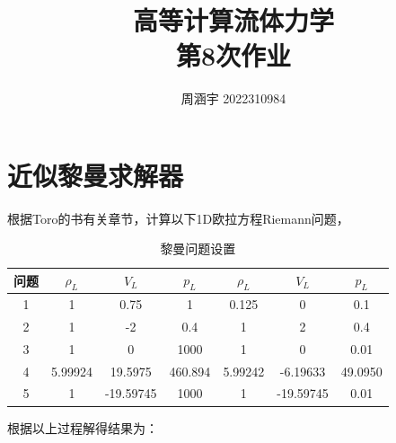 \documentclass[UTF8,zihao=5]{ctexart} %
\title{{\bfseries\rmfamily\Huge{高等计算流体力学\hspace{1em}\\第8次作业}}}
\author{周涵宇 2022310984}
\date{}
\begin{document}
\maketitle

\section{近似黎曼求解器}

根据Toro的书\cite{2013Riemann}有关章节，计算以下1D欧拉方程Riemann问题，

\begin{table}[H]
    \begin{center}
        \caption{黎曼问题设置}
        \begin{tabular}{|c|c|c|c|c|c|c|}
            \hline
            问题 & $\rho_L$ & $V_L$     & $p_L$   & $\rho_L$ & $V_L$     & $p_L$   \\
            \hline
            1    & 1        & 0.75      & 1       & 0.125    & 0         & 0.1     \\
            \hline
            2    & 1        & -2        & 0.4     & 1        & 2         & 0.4     \\
            \hline
            3    & 1        & 0         & 1000    & 1        & 0         & 0.01    \\
            \hline
            4    & 5.99924  & 19.5975   & 460.894 & 5.99242  & -6.19633  & 49.0950 \\
            \hline
            5    & 1        & -19.59745 & 1000    & 1        & -19.59745 & 0.01    \\
            \hline
        \end{tabular}
    \end{center}
\end{table}

根据以上过程解得结果为：
\end{document}
